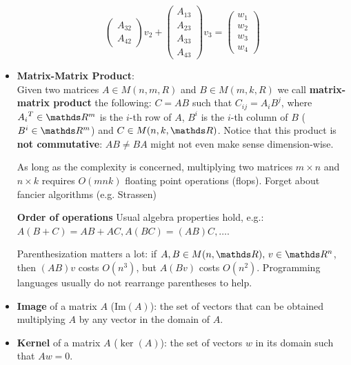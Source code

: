 \documentclass[computationalMathematics.tex]{subfiles}
\begin{document}
\begin{itemize}
\[\begin{pmatrix}
                A_{32}\\
                A_{42}
        \end{pmatrix}v_2 + 
        \begin{pmatrix}
                A_{13}\\
                A_{23}\\
                A_{33}\\
                A_{43}
        \end{pmatrix}v_3 =
        \begin{pmatrix}
                  w_1\\
                  w_2\\
                  w_3\\
                  w_4
        \end{pmatrix}
      \]
  \item \textbf{Matrix-Matrix Product}:\\
        Given two matrices $A \in M(n, m, R)$ and $B \in M(m, k, R)$ we call \textbf{matrix-matrix product} the following:
        $C=AB$ such that $C_{ij} = A_i B^j$, where $\tr{A_i} \in \R^m$ is the $i$-th row of $A$, $B^i$ is the $i$-th column of $B$ ($B^i \in \R^m$) and $C \in M(n, k, \R)$. Notice that this product is \textbf{not commutative}: $AB \neq BA$ might not even make sense dimension-wise.
        
As long as the complexity is concerned, multiplying two matrices $m \times n$ and $n \times k$ requires $O(m n k)$ floating point operations (flops). Forget about fancier algorithms (e.g. Strassen)
        
\begin{myframe}{\bf Order of operations}
  Usual algebra properties hold, e.g.: $A(B + C) = AB + AC, A(BC) = (AB)C, \ldots$.
  
  Parenthesization matters a lot: if $A, B \in M(n, \R), \, v \in \R^n$, then $(AB)v$ costs $O(n^3)$, but $A(Bv)$ costs $O(n^2)$.
  Programming languages usually do not rearrange parentheses to help.
\end{myframe}

     \item \textbf{Image} of a matrix $A$ ($\text{Im}(A)$):  the set of vectors that can    be obtained multiplying $A$ by any vector in the domain of $A$.

     \item \textbf{Kernel} of a matrix $A$ ($\ker(A)$):  the set of vectors $w$ in its domain such that $Aw=0$.


\end{itemize}
\end{document}
